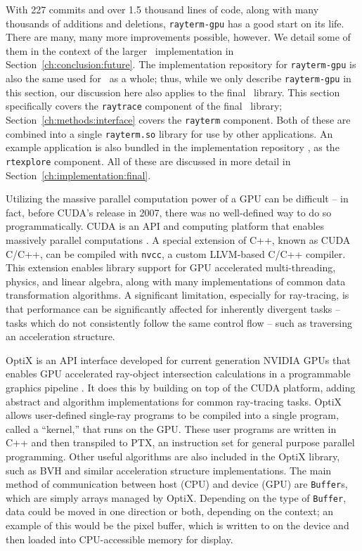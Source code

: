 With 227 commits and over 1.5 thousand lines of code, along with many thousands of additions and deletions, \texttt{rayterm-gpu} has a good start on its life.
There are many, many more improvements possible, however.
We detail some of them in the context of the larger \name\ implementation in Section~\ref{ch:conclusion:future}.
The implementation repository for \texttt{rayterm-gpu} \cite{raytermGpuImpl} is also the same used for \name\ as a whole; thus, while we only describe \texttt{rayterm-gpu} in this section, our discussion here also applies to the final \name\ library.
This section specifically covers the \texttt{raytrace} component of the final \name\ library; Section~\ref{ch:methods:interface} covers the \texttt{rayterm} component.
Both of these are combined into a single \texttt{rayterm.so} library for use by other applications.
An example application is also bundled in the implementation repository \cite{raytermGpuImpl}, as the \texttt{rtexplore} component.
All of these are discussed in more detail in Section~\ref{ch:implementation:final}.

 \label{ch:methods:renderer:parallel:libraries}

Utilizing the massive parallel computation power of a GPU can be difficult -- in fact, before CUDA's release in 2007, there was no well-defined way to do so programmatically.
CUDA is an API and computing platform that enables massively parallel computations \cite{nvidia2011cuda}.
A special extension of C++, known as CUDA C/C++, can be compiled with \texttt{nvcc}, a custom LLVM-based C/C++ compiler.
This extension enables library support for GPU accelerated multi-threading, physics, and linear algebra, along with many implementations of common data transformation algorithms.
A significant limitation, especially for ray-tracing, is that performance can be significantly affected for inherently divergent tasks -- tasks which do not consistently follow the same control flow -- such as traversing an acceleration structure.

OptiX is an API interface developed for current generation NVIDIA GPUs that enables GPU accelerated ray-object intersection calculations in a programmable graphics pipeline \cite{parker2010optix, nvidia2019optixdoc}.
It does this by building on top of the CUDA platform, adding abstract and algorithm implementations for common ray-tracing tasks.
OptiX allows user-defined single-ray programs to be compiled into a single program, called a ``kernel,'' that runs on the GPU.
These user programs are written in C++ and then transpiled to PTX, an instruction set for general purpose parallel programming.
Other useful algorithms are also included in the OptiX library, such as BVH and similar acceleration structure implementations.
The main method of communication between host (CPU) and device (GPU) are \texttt{Buffer}s, which are simply arrays managed by OptiX.
Depending on the type of \texttt{Buffer}, data could be moved in one direction or both, depending on the context; an example of this would be the pixel buffer, which is written to on the device and then loaded into CPU-accessible memory for display.

